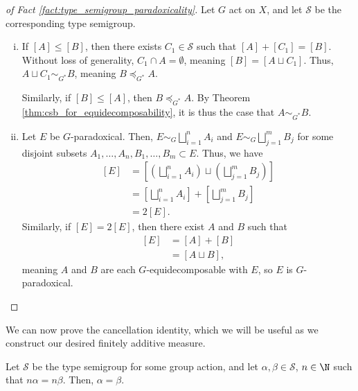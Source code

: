 \begin{proof}[of Fact \ref{fact:type_semigroup_paradoxicality}]
  Let $G$ act on $X$, and let $\mathcal{S}$ be the corresponding type semigroup.
  \begin{enumerate}[(i)]
    \item If $\left[A\right]\leq \left[B\right]$, then there exists $C_1\in \mathcal{S}$ such that $\left[A\right] + \left[C_1\right] = \left[B\right]$. Without loss of generality, $C_1\cap A= \emptyset$, meaning $\left[B\right] = \left[A\sqcup C_1\right]$. Thus, $A\sqcup C_1 \sim_{G^{\ast}} B$, meaning $B\preceq_{G^{\ast}}A$.\newline

      Similarly, if $\left[B\right]\leq \left[A\right]$, then $B\preceq_{G^{\ast}}A$. By Theorem \ref{thm:csb_for_equidecomposability}, it is thus the case that $A\sim_{G^{\ast}}B$.
    \item Let $E$ be $G$-paradoxical. Then, $E\sim_{G}\bigsqcup_{i=1}^{n}A_i$ and $E\sim_{G}\bigsqcup_{j=1}^{m}B_j$ for some disjoint subsets $A_1,\dots,A_n,B_1,\dots,B_m\subset E$. Thus, we have
      \begin{align*}
        \left[E\right] &= \left[\left(\bigsqcup_{i=1}^{n}A_i\right)\sqcup \left(\bigsqcup_{j=1}^{m}B_j\right)\right]\\
                       &= \left[\bigsqcup_{i=1}^{n}A_i\right] + \left[\bigsqcup_{j=1}^{m}B_j\right]\\
                       &= 2\left[E\right].
      \end{align*}
      Similarly, if $\left[E\right] = 2\left[E\right]$, then there exist $A$ and $B$ such that
      \begin{align*}
        \left[E\right] &= \left[A\right] + \left[B\right]\\
                       &= \left[A\sqcup B\right],
      \end{align*}
      meaning $A$ and $B$ are each $G$-equidecomposable with $E$, so $E$ is $G$-paradoxical.
  \end{enumerate}
\end{proof}
We can now prove the cancellation identity, which we will be useful as we construct our desired finitely additive measure.
\begin{theorem}
  Let $\mathcal{S}$ be the type semigroup for some group action, and let $\alpha,\beta\in \mathcal{S}$, $n\in \N$ such that $n\alpha = n\beta$. Then, $\alpha = \beta$.
\end{theorem}
